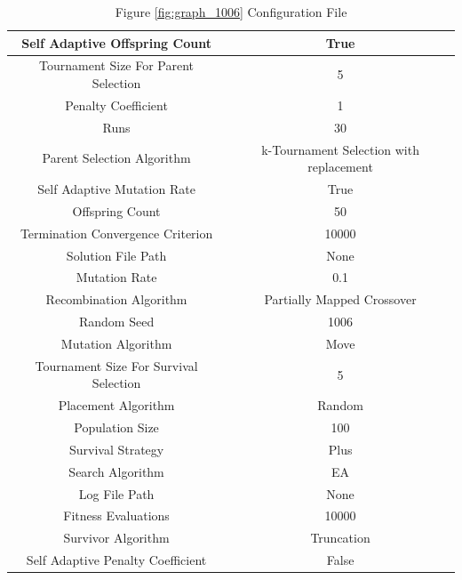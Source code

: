 \documentclass{standalone}
\begin{document}
\begin{table}[!htb]
	\centering
	\caption{Figure \ref{fig:graph_1006} Configuration File}
	\label{tab:graph_1006}
	\begin{tabular}{| c | c |}
		\hline
		Self Adaptive Offspring Count		& True		 \\
		\hline
		Tournament Size For Parent Selection		& 5		 \\
		\hline
		Penalty Coefficient		& 1		 \\
		\hline
		Runs		& 30		 \\
		\hline
		Parent Selection Algorithm		& k-Tournament Selection with replacement		 \\
		\hline
		Self Adaptive Mutation Rate		& True		 \\
		\hline
		Offspring Count		& 50		 \\
		\hline
		Termination Convergence Criterion		& 10000		 \\
		\hline
		Solution File Path		& None		 \\
		\hline
		Mutation Rate		& 0.1		 \\
		\hline
		Recombination Algorithm		& Partially Mapped Crossover		 \\
		\hline
		Random Seed		& 1006		 \\
		\hline
		Mutation Algorithm		& Move		 \\
		\hline
		Tournament Size For Survival Selection		& 5		 \\
		\hline
		Placement Algorithm		& Random		 \\
		\hline
		Population Size		& 100		 \\
		\hline
		Survival Strategy		& Plus		 \\
		\hline
		Search Algorithm		& EA		 \\
		\hline
		Log File Path		& None		 \\
		\hline
		Fitness Evaluations		& 10000		 \\
		\hline
		Survivor Algorithm		& Truncation		 \\
		\hline
		Self Adaptive Penalty Coefficient		& False		 \\
		\hline
	\end{tabular}
\end{table}
\end{document}
